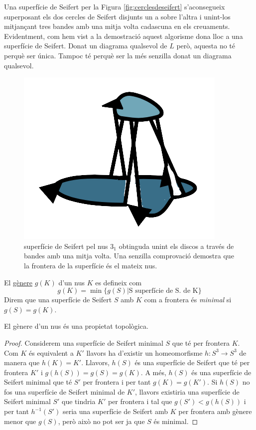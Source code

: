 Una superfície de Seifert per la Figura \ref{fig:cerclesdeseifert} s'aconsegueix superposant els dos cercles de Seifert disjunts un a sobre l'altra i unint-los mitjançant tres bandes amb una mitja volta cadascuna en els creuaments. Evidentment, com hem vist a la demostració aquest algorisme dona lloc a una superfície de Seifert. Donat un diagrama qualsevol de $L$ però, aquesta no té perquè ser única. Tampoc té perquè ser la més senzilla donat un diagrama qualsevol.

\begin{figure}
	\centering
	\includegraphics[width=0.6\linewidth]{img/superficiedeseifert.png}
	\caption{superfície de Seifert pel nus $3_1$ obtinguda unint els discos a través de bandes amb una mitja volta. Una senzilla comprovació demostra que la frontera de la superfície és el mateix nus.}\label{fig:superficiedeseifert2}
\end{figure}

\begin{definition}\label{def:genere}
	El \underline{gènere} $g(K)$ d'un nus $K$ es defineix com $$g(K)=\min\{g(S)| \text{S superfície de S. de K}\}$$ Direm que una superfície de Seifert $S$ amb $K$ com a frontera és \textit{minimal} si $g(S)=g(K)$.
\end{definition}

\begin{proposition}
	El gènere d'un nus és una propietat topològica.
\end{proposition}

\begin{proof}
	Considerem una superfície de Seifert minimal $S$ que té per frontera $K$. Com $K$ és equivalent a $K'$ llavors ha d'existir un homeomorfisme $h:S^3\rightarrow S^3$ de manera que $h(K)=K'$. Llavors, $h(S)$ és una superfície de Seifert que té per frontera $K'$ i $g(h(S))=g(S)=g(K)$. A més, $h(S)$ és una superfície de Seifert minimal que té $S'$ per frontera i per tant $g(K)=g(K')$. Si $h(S)$ no fos una superfície de Seifert minimal de $K'$, llavors existiria una superfície de Seifert minimal $S'$ que tindria $K'$ per frontera i tal que $g(S')<g(h(S))$ i per tant $h^{-1}(S')$ seria una superfície de Seifert amb $K$ per frontera amb gènere menor que $g(S)$, però això no pot ser ja que $S$ és minimal.
\end{proof}

